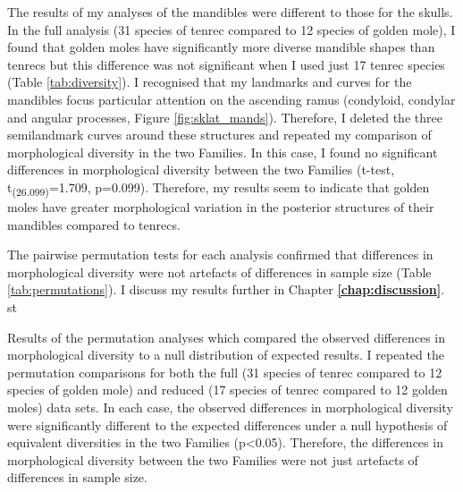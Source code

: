 	The results of my analyses of the mandibles were different to those for the skulls. In the full analysis (31 species of tenrec compared to 12 species of golden mole), I found that golden moles have significantly more diverse mandible shapes than tenrecs but this difference was not significant when I used just 17 tenrec species (Table \ref{tab:diversity}). 
	I recognised that my landmarks and curves for the mandibles focus particular attention on the ascending ramus (condyloid, condylar and angular processes, Figure \ref{fig:sklat_mands}). Therefore, I  deleted the three semilandmark curves around these structures and repeated my comparison of morphological diversity in the two Families. In this case, I found no significant differences in morphological diversity between the two Families (t-test, t\textsubscript{(26.099)}=1.709, p=0.099). Therefore, my results seem to indicate that golden moles have greater morphological variation in the posterior structures of their mandibles compared to tenrecs.
	
	The pairwise permutation tests for each analysis confirmed that differences in morphological diversity were not artefacts of differences in sample size (Table \ref{tab:permutations}). I discuss my results further in Chapter \textbf{\ref{chap:discussion}}.
	st
\begin{table}[!htbp]			
	\caption[Results of the permutation tests]{Results of the permutation analyses which compared the observed differences in morphological diversity to a null distribution of expected results. I repeated the permutation comparisons for both the full (31 species of tenrec compared to 12 species of golden mole) and reduced (17 species of tenrec compared to 12 golden moles) data sets. In each case, the observed differences in morphological diversity were significantly different to the expected differences under a null hypothesis of equivalent diversities in the two Families (p<0.05). Therefore, the differences in morphological diversity between the two Families were not just artefacts of differences in sample size.}
	 
	\label{tab:permutations}  
\end{table}
	


	
	





